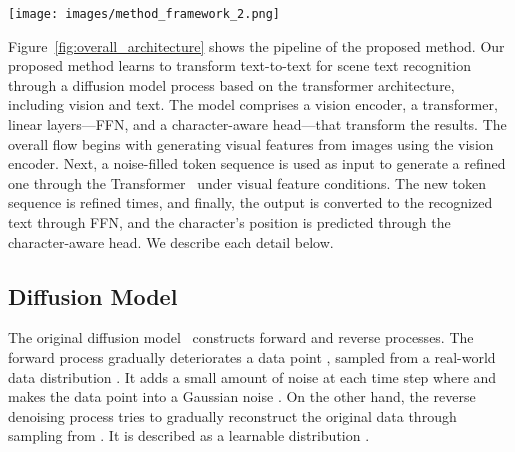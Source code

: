 \documentclass{article}
\begin{document}
\begin{figure*}[htp]
	\centering
	\texttt{[image: images/method\_framework\_2.png]}
	\caption{
\textbf{The pipeline of the proposed scene text recognition using a diffusion model.}
It consists of the vision encoder~\cite{dosovitskiy2020vit}, Transformer~\cite{vaswani2017transformer} with an additional time-based positional encoding, FFN and character-aware head.
\texttt{[E]} and \texttt{[P]} are abbreviations for special tokens \texttt{[EOS]} and \texttt{[PAD]}, respectively.
The proposed method performs text recognition by repeatedly refining the input sequence  based on image information.
FFN performs character classification, while the character-aware head predicts where a character exists in a fixed-length sequence.
	}
	\label{fig:overall_architecture}
    \vspace*{-1.00\baselineskip}
\end{figure*}

Figure~\ref{fig:overall_architecture} shows the pipeline of the proposed method.
Our proposed method learns to transform text-to-text for scene text recognition through a diffusion model process based on the transformer architecture, including vision and text.
The model comprises a vision encoder, a transformer, linear layers---FFN, and a character-aware head---that transform the results.
The overall flow begins with generating visual features from images using the vision encoder.
Next, a noise-filled token sequence  is used as input to generate a refined one  through the Transformer~\cite{vaswani2017transformer} under visual feature conditions.
The new token sequence is refined  times, and finally, the output  is converted to the recognized text through FFN, and the character's position is predicted through the character-aware head.
We describe each detail below.


\subsection{Diffusion Model}
The original diffusion model~\cite{sohl2015diffusionmodel} constructs forward and reverse processes.
The forward process gradually deteriorates a data point , sampled from a real-world data distribution .
It adds a small amount of noise at each time step where  and makes the data point into a Gaussian noise .
On the other hand, the reverse denoising process tries to gradually reconstruct the original data  through sampling from .
It is described as a learnable distribution . 
\end{document}
